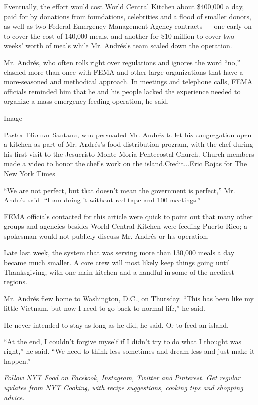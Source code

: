 Eventually, the effort would cost World Central Kitchen about \$400,000
a day, paid for by donations from foundations, celebrities and a flood
of smaller donors, as well as two Federal Emergency Management Agency
contracts --- one early on to cover the cost of 140,000 meals, and
another for \$10 million to cover two weeks' worth of meals while Mr.
Andrés's team scaled down the operation.

Mr. Andrés, who often rolls right over regulations and ignores the word
``no,'' clashed more than once with FEMA and other large organizations
that have a more-seasoned and methodical approach. In meetings and
telephone calls, FEMA officials reminded him that he and his people
lacked the experience needed to organize a mass emergency feeding
operation, he said.

Image

Pastor Eliomar Santana, who persuaded Mr. Andrés to let his congregation
open a kitchen as part of Mr. Andrés's food-distribution program, with
the chef during his first visit to the Jesucristo Monte Moria
Pentecostal Church. Church members made a video to honor the chef's work
on the island.Credit...Eric Rojas for The New York Times

``We are not perfect, but that doesn't mean the government is perfect,''
Mr. Andrés said. ``I am doing it without red tape and 100 meetings.''

FEMA officials contacted for this article were quick to point out that
many other groups and agencies besides World Central Kitchen were
feeding Puerto Rico; a spokesman would not publicly discuss Mr. Andrés
or his operation.

Late last week, the system that was serving more than 130,000 meals a
day became much smaller. A core crew will most likely keep things going
until Thanksgiving, with one main kitchen and a handful in some of the
neediest regions.

Mr. Andrés flew home to Washington, D.C., on Thursday. ``This has been
like my little Vietnam, but now I need to go back to normal life,'' he
said.

He never intended to stay as long as he did, he said. Or to feed an
island.

``At the end, I couldn't forgive myself if I didn't try to do what I
thought was right,'' he said. ``We need to think less sometimes and
dream less and just make it happen.''

\href{https://www.facebook.com/nytfood/}{\emph{Follow NYT Food on
Facebook}}\emph{,}
\href{https://instagram.com/nytfood}{\emph{Instagram}}\emph{,}
\href{https://twitter.com/nytfood}{\emph{Twitter}} \emph{and}
\href{https://www.pinterest.com/nytfood/}{\emph{Pinterest}}\emph{.}
\href{https://www.nytimes.com/newsletters/cooking}{\emph{Get regular
updates from NYT Cooking, with recipe suggestions, cooking tips and
shopping advice}}\emph{.}

